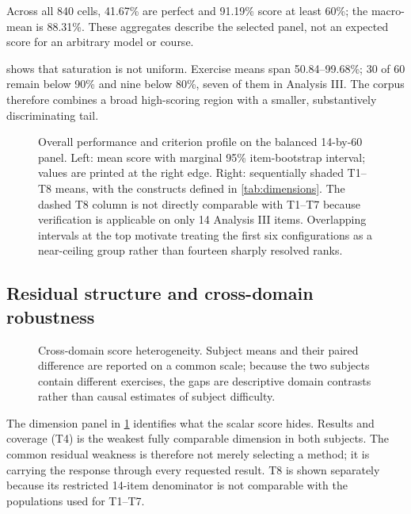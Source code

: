 \documentclass[11pt,a4paper,twocolumn]{article}
\begin{document}
Across all 840 cells, 41.67\% are perfect and 91.19\% score at least 60\%; the
macro-mean is 88.31\%. These aggregates describe the selected panel, not an
expected score for an arbitrary model or course.

 shows that saturation is not uniform.
Exercise means span 50.84--99.68\%; 30 of 60 remain below 90\% and nine below
80\%, seven of them in Analysis III. The corpus therefore combines a broad
high-scoring region with a smaller, substantively discriminating tail.

\begin{figure}[!t]
\centering
\resizebox{0.97\textwidth}{!}{}
\caption{Overall performance and criterion profile on the balanced 14-by-60
panel. Left: mean score with marginal 95\% item-bootstrap interval; values are
printed at the right edge. Right: sequentially shaded T1--T8 means, with the
constructs defined in \cref{tab:dimensions}. The dashed T8 column is not
directly comparable with T1--T7 because verification is applicable on only 14
Analysis III items. Overlapping intervals at the top motivate treating the
first six configurations as a near-ceiling group rather than fourteen sharply
resolved ranks.}
\label{fig:performance}
\end{figure}

\subsection{Residual structure and cross-domain robustness}

\begin{figure}[!t]
\centering
\resizebox{0.95\textwidth}{!}{}
\caption{Cross-domain score heterogeneity. Subject means and their paired
difference are reported on a common scale; because the two subjects contain
different exercises, the gaps are descriptive domain contrasts rather than
causal estimates of subject difficulty.}
\label{fig:subjects}
\end{figure}

The dimension panel in \cref{fig:performance} identifies what the scalar score
hides. Results and coverage (T4) is the weakest fully comparable dimension in
both subjects. The common residual weakness is therefore not merely selecting
a method; it is carrying the response through every requested result. T8 is
shown separately because its restricted 14-item denominator is not comparable
with the populations used for T1--T7.
\end{document}
